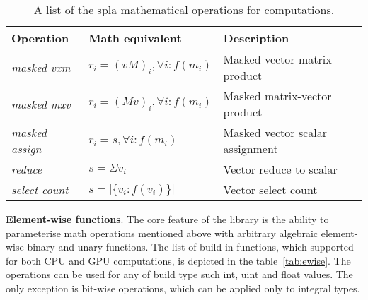 \begin{table}[tbp]
\caption{A list of the spla mathematical operations for computations.}
\begin{center}
    \begin{tabular}{|l|l|l|}
    \hline
    \textbf{Operation}     & \textbf{Math equivalent}               & \textbf{Description}           \\ \hline 
    \hline
    \textit{masked vxm}    & $r_i = (vM)_i, \forall i: f(m_i)$   & Masked vector-matrix product   \\ \hline
    \textit{masked mxv}    & $r_i = (Mv)_i, \forall i: f(m_i)$   & Masked matrix-vector product   \\ \hline 
    \hline
    \textit{masked assign} & $r_i = s, \forall i: f(m_i)$        & Masked vector scalar assignment\\ \hline 
    \hline
    \textit{reduce}        & $s = \Sigma v_i$                       & Vector reduce to scalar        \\ \hline
    \textit{select count}  & $s = |\{v_i: f(v_i)\}|$                & Vector select count            \\ \hline
    \end{tabular}
    \label{tab:operations}
\end{center}
\end{table}

\textbf{Element-wise functions}. The core feature of the library is the ability to parameterise math operations mentioned above with arbitrary algebraic element-wise binary and unary functions. The list of build-in functions, which supported for both CPU and GPU computations, is depicted in the table~\ref{tab:ewise}. The operations can be used for any of build type such int, uint and float values. The only exception is bit-wise operations, which can be applied only to integral types.\\

